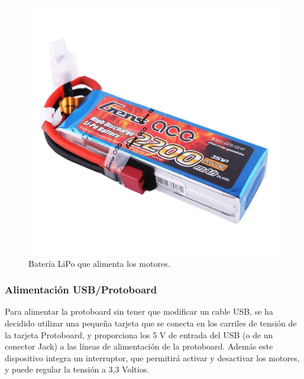 \begin{figure}[H]
  \begin{center}
    \includegraphics[scale=0.2]{imagenes/robot/bateria.jpg}
  \end{center}
  \caption{Batería LiPo que alimenta los motores.}
  \label{figura:rpi-modulo-bateria}
\end{figure}


\subsubsection{ Alimentación USB/Protoboard }

Para alimentar la protoboard sin tener que modificar un cable USB, se ha decidido utilizar una pequeña tarjeta que se conecta en los carriles de tensión de la tarjeta Protoboard, y
proporciona los 5 V de entrada del USB (o de un conector Jack) a las líneas de alimentación de la protoboard. Además este dispositivo integra un interruptor, que permitirá activar y
desactivar los motores, y puede regular la tensión a 3,3 Voltios.\\

